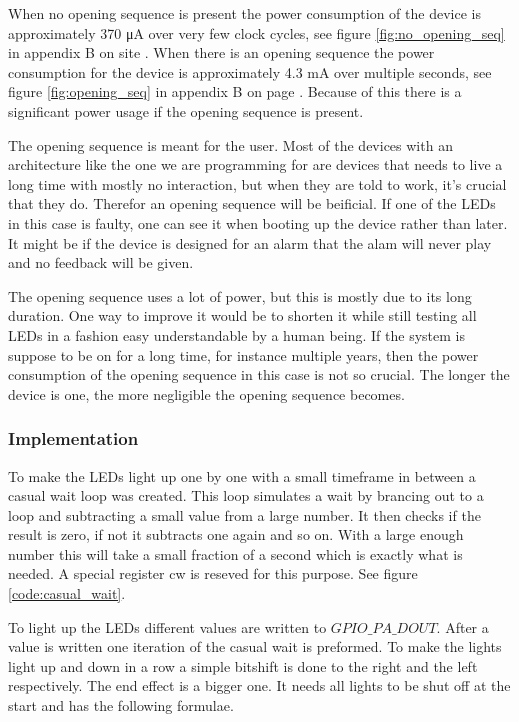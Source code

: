 When no opening sequence is present the power consumption of the device is approximately 370 \si{\micro\ampere} over very few clock cycles, see figure \ref{fig:no_opening_seq} in appendix B on site \pageref{fig:no_opening_seq}. When there is an opening sequence the power consumption for the device is approximately 4.3 \si{\milli\ampere} over multiple seconds, see figure \ref{fig:opening_seq} in appendix B on page \pageref{fig:opening_seq}. Because of this there is a significant power usage if the opening sequence is present.

The opening sequence is meant for the user. Most of the devices with an architecture like the one we are programming for are devices that needs to live a long time with mostly no interaction, but when they are told to work, it's crucial that they do. Therefor an opening sequence will be beificial. If one of the LEDs in this case is faulty, one can see it when booting up the device rather than later. It might be if the device is designed for an alarm that the alam will never play and no feedback will be given.

The opening sequence uses a lot of power, but this is mostly due to its long duration. One way to improve it would be to shorten it while still testing all LEDs in a fashion easy understandable by a human being. If the system is suppose to be on for a long time, for instance multiple years, then the power consumption of the opening sequence in this case is not so crucial. The longer the device is one, the more negligible the opening sequence becomes.

\subsubsection{Implementation}

To make the LEDs light up one by one with a small timeframe in between a casual wait loop was created. This loop simulates a wait by brancing out to a loop and subtracting a small value from a large number. It then checks if the result is zero, if not it subtracts one again and so on. With a large enough number this will take a small fraction of a second which is exactly what is needed. A special register cw is reseved for this purpose. See figure \ref{code:casual_wait}.

To light up the LEDs different values are written to $GPIO\_PA\_DOUT$. After a value is written one iteration of the casual wait is preformed. To make the lights light up and down in a row a simple bitshift is done to the right and the left respectively. The end effect is a bigger one. It needs all lights to be shut off at the start and has the following formulae.

